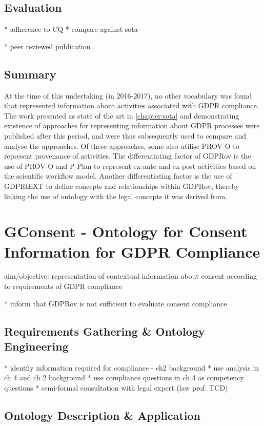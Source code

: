 \subsection{Evaluation}

* adherence to CQ
* compare against sota

* peer reviewed publication

\subsection*{Summary}
At the time of this undertaking (in 2016-2017), no other vocabulary was found that represented information about activities associated with GDPR compliance.
The work presented as state of the art in \autoref{chapter:sota} and demonstrating existence of approaches for representing information about GDPR processes were published after this period, and were thus subsequently used to compare and analyse the approaches. Of these approaches, some also utilise PROV-O to represent provenance of activities. The differentiating factor of GDPRov is the use of PROV-O and P-Plan to represent ex-ante and ex-post activities based on the scientific workflow model. Another differentiating factor is the use of GDPRtEXT to define concepts and relationships within GDPRov, thereby linking the use of ontology with the legal concepts it was derived from.

\section{GConsent - Ontology for Consent Information for GDPR Compliance}\label{sec:voc:GConsent}

aim/objective: representation of contextual information about consent according to requirements of GDPR compliance

* inform that GDPRov is not sufficient to evaluate consent compliance

\subsection{Requirements Gathering \& Ontology Engineering}

* identfiy information required for compliance - ch2 background
* use analysis in ch 4 and ch 2 background
* use compliance questions in ch 4 as competency questions
* semi-formal consultation with legal expert (law prof. TCD)

\subsection{Ontology Description \& Application}

